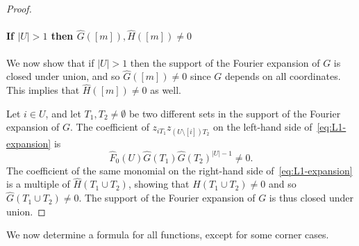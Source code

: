 \documentclass{article}
\theoremstyle{definition}
\theoremstyle{remark}
\begin{document}
\begin{proof}
\paragraph{If $|U| > 1$ then $\hat{G}([m]),\hat{H}([m]) \neq 0$}
We now show that if $|U| > 1$ then the support of the Fourier expansion of $G$ is closed under union, and so $\hat{G}([m]) \neq 0$ since $G$ depends on all coordinates. This implies that $\hat{H}([m]) \neq 0$ as well.

Let $i \in U$, and let $T_1,T_2 \neq \emptyset$ be two different sets in the support of the Fourier expansion of $G$. The coefficient of $z_{iT_1} z_{(U \setminus [i])T_2}$ on the left-hand side of~\eqref{eq:L1-expansion} is
\[
 \hat{F}_0(U) \hat{G}(T_1) \hat{G}(T_2)^{|U|-1} \neq 0.
\]
The coefficient of the same monomial on the right-hand side of~\eqref{eq:L1-expansion} is a multiple of $\hat{H}(T_1 \cup T_2)$, showing that $\hat{H}(T_1 \cup T_2) \neq 0$ and so $\hat{G}(T_1 \cup T_2) \neq 0$. The support of the Fourier expansion of $G$ is thus closed under union. \end{proof}

We now determine a formula for all functions, except for some corner cases.
\end{document}
